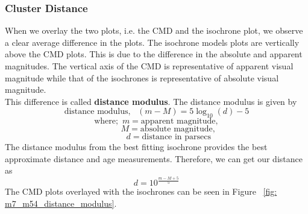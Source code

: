 \documentclass[12pt]{article}
\begin{document}
		\subsubsection{Cluster Distance}
		When we overlay the two plots, i.e. the CMD and the isochrone plot, we observe a clear average difference in the plots. The isochrone models plots are vertically above the CMD plots. This is due to the difference in the absolute and apparent magnitudes. The vertical axis of the CMD is representative of apparent visual magnitude while that of the isochrones is representative of absolute visual magnitude.\\
		This difference is called \textbf{distance modulus}. The distance modulus is given by
		\[\text{distance modulus}, \,\,\,\, \left(m - M\right) = 5\log_{10}(d) - 5\]
		\[\text{where}; \,\, m = \text{apparent magnitude}, \]
		\[ \,\,\,\,\,\,\,\,\,\,\,\,\,\,\,\,\, M = \text{absolute magnitude}, \]
		\[ \,\,\,\,\,\,\,\,\,\,\,\,\,\,\,\,\, d = \text{distance in parsecs}\]
		The distance modulus from the best fitting isochrone provides the best approximate distance and age measurements. Therefore, we can get our distance as
		\begin{equation}
			d = 10^{\frac{m - M + 5}{5}}
		\end{equation}
		The CMD plots overlayed with the isochrones can be seen in Figure ~\ref{fig: m7_m54_distance_modulus}.\\
\end{document}
